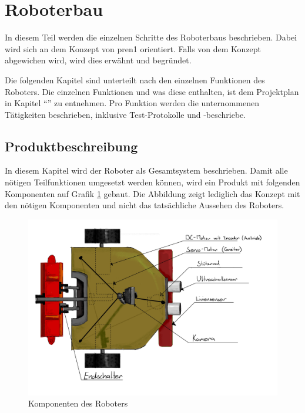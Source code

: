 \section{Roboterbau}

In diesem Teil werden die einzelnen Schritte des Roboterbaus beschrieben. Dabei wird sich an dem Konzept von \acrshort{pren1} orientiert. Falls von dem Konzept abgewichen wird, wird dies erwähnt und begründet.

Die folgenden Kapitel sind unterteilt nach den einzelnen Funktionen des Roboters. Die einzelnen Funktionen und was diese enthalten, ist dem Projektplan in Kapitel ``'' zu entnehmen. Pro Funktion werden die unternommenen Tätigkeiten beschrieben, inklusive Test-Protokolle und -beschriebe.

\subsection{Produktbeschreibung}

In diesem Kapitel wird der Roboter als Gesamtsystem beschrieben.
Damit alle nötigen Teilfunktionen umgesetzt werden können, wird ein Produkt mit folgenden Komponenten auf Grafik \ref{fig:components} gebaut. Die Abbildung zeigt lediglich das Konzept mit den nötigen Komponenten und nicht das tatsächliche Aussehen des Roboters.


\begin{figure}[H]
\centering
\includegraphics[width=\textwidth]{assets/gesamtkonzept/Skizze-Fahrzeugkonzept-Beschriftet.jpg}
\caption{Komponenten des Roboters}
\label{fig:components}
\end{figure}

